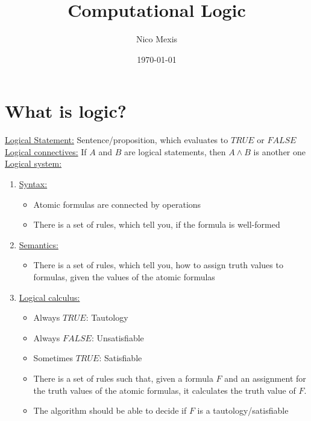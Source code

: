 \documentclass[a4paper]{article}
\title{Computational Logic}
\author{Nico Mexis}
\date{\today}
\newcommand{\ul}{\underline}
\begin{document}
\maketitle
\newpage

\tableofcontents
\newpage

\section{What is logic?}
\ul{Logical Statement:} Sentence/proposition, which evaluates to $TRUE$ or $FALSE$\\
\ul{Logical connectives:} If $A$ and $B$ are logical statements, then $A\wedge B$ is another one\\
\ul{Logical system:}
\begin{enumerate}[(1)]
	\item \ul{Syntax:}
	\begin{itemize}
		\item Atomic formulas are connected by operations
		\item There is a set of rules, which tell you, if the formula is well-formed
	\end{itemize}
	\item \ul{Semantics:}
	\begin{itemize}
		\item There is a set of rules, which tell you, how to assign truth values to formulas, given the values of the atomic formulas
	\end{itemize}
	\item \ul{Logical calculus:}
	\begin{itemize}
		\item Always $TRUE$: Tautology
		\item Always $FALSE$: Unsatisfiable
		\item Sometimes $TRUE$: Satisfiable
		\item There is a set of rules such that, given a formula $F$ and an assignment for the truth values of the atomic formulas, it calculates the truth value of $F$.
		\item The algorithm should be able to decide if $F$ is a tautology/satisfiable
	\end{itemize}
\end{enumerate}
\end{document}
